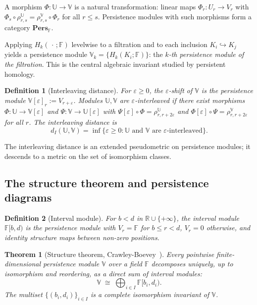 \documentclass[onluarkali,ingilizce,yukseklisans,karton,LisansustuEgitim]{itutez}
\newtheorem{definition}{Definition}[chapter]
\newtheorem{theorem}{Theorem}[chapter]
\providecommand{\R}{\mathbb{R}}
\providecommand{\F}{\mathbb{F}}
\providecommand{\1}{\mathbf{1}}
\begin{document}
A morphism $\Phi\colon\mathbb{U}\to\mathbb{V}$ is a natural transformation: linear maps $\Phi_r\colon U_r\to V_r$ with $\Phi_s\circ\rho^\mathbb{U}_{r,s}=\rho^\mathbb{V}_{r,s}\circ\Phi_r$ for all $r\leq s$. Persistence modules with such morphisms form a category $\mathbf{Pers}_\F$.

Applying $H_k(\,\cdot\,;\F)$ levelwise to a filtration and to each inclusion $K_i\hookrightarrow K_j$ yields a persistence module $\mathbb{V}_k=\{H_k(K_i;\F)\}$: the \emph{$k$-th persistence module of the filtration}. This is the central algebraic invariant studied by persistent homology.

\begin{definition}[Interleaving distance]
\label{def:interleaving}
For $\varepsilon\geq 0$, the \emph{$\varepsilon$-shift} of $\mathbb{V}$ is the persistence module $\mathbb{V}[\varepsilon]_r:=V_{r+\varepsilon}$. Modules $\mathbb{U},\mathbb{V}$ are \emph{$\varepsilon$-interleaved} if there exist morphisms $\Phi\colon\mathbb{U}\to\mathbb{V}[\varepsilon]$ and $\Psi\colon\mathbb{V}\to\mathbb{U}[\varepsilon]$ with $\Psi[\varepsilon]\circ\Phi=\rho^\mathbb{U}_{r,r+2\varepsilon}$ and $\Phi[\varepsilon]\circ\Psi=\rho^\mathbb{V}_{r,r+2\varepsilon}$ for all $r$. The \emph{interleaving distance} is
\[
  d_I(\mathbb{U},\mathbb{V})=\inf\bigl\{\varepsilon\geq 0:\mathbb{U}\text{ and }\mathbb{V}\text{ are }\varepsilon\text{-interleaved}\bigr\}.
\]
\end{definition}

The interleaving distance is an extended pseudometric on persistence modules; it descends to a metric on the set of isomorphism classes.

\subsection{The structure theorem and persistence diagrams}
\label{subsubsec:structure}

\begin{definition}[Interval module]
\label{def:interval-mod}
For $b<d$ in $\R\cup\{+\infty\}$, the \emph{interval module} $\F[b,d)$ is the persistence module with $V_r=\F$ for $b\leq r<d$, $V_r=0$ otherwise, and identity structure maps between non-zero positions.
\end{definition}

\begin{theorem}[Structure theorem, Crawley-Boevey~\parencite{crawley2015decomposition}]
\label{thm:structure}
Every pointwise finite-dimensional persistence module $\mathbb{V}$ over a field $\F$ decomposes uniquely, up to isomorphism and reordering, as a direct sum of interval modules:
\begin{equation}
  \mathbb{V}\;\cong\;\bigoplus_{i\in I}\F[b_i,d_i).
  \label{eq:structure}
\end{equation}
The multiset $\{(b_i,d_i)\}_{i\in I}$ is a complete isomorphism invariant of $\mathbb{V}$.
\end{theorem}
\end{document}
